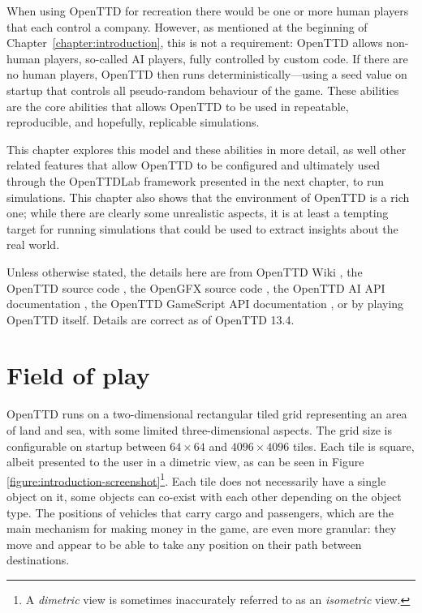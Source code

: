 \documentclass[logo,msc,dsti]{style/infthesis}    %
\begin{document}
{When using OpenTTD for recreation there would be one or more human players that each control a company. However, as mentioned at the beginning of Chapter~\ref{chapter:introduction}, this is not a requirement: OpenTTD allows non-human players, so-called AI players, fully controlled by custom code. If there are no human players, OpenTTD then runs deterministically---using a seed value on startup that controls all pseudo-random behaviour of the game. These abilities are the core abilities that allows OpenTTD to be used in repeatable, reproducible, and hopefully, replicable simulations.

This chapter explores this model and these abilities in more detail, as well other related features that allow OpenTTD to be configured and ultimately used through the OpenTTDLab framework presented in the next chapter, to run simulations. This chapter also shows that the environment of OpenTTD is a rich one; while there are clearly some unrealistic aspects, it is at least a tempting target for running simulations that could be used to extract  insights about the real world.

Unless otherwise stated, the details here are from OpenTTD Wiki \cite{OpenTTDWiki}, the OpenTTD source code \cite{OpenTTDSource}, the OpenGFX source code \cite{OpenGFXSource}, the OpenTTD AI API documentation \cite{OpenTTDAIAPIDocs}, the OpenTTD GameScript API documentation \cite{OpenTTDGSAPIDocs}, or by playing OpenTTD itself. Details are correct as of OpenTTD 13.4.

\section{Field of play}

OpenTTD runs on a two-dimensional rectangular tiled grid representing an area of land and sea, with some limited three-dimensional aspects. The grid size is configurable on startup between $64 \times 64$ and $4096 \times 4096$ tiles. Each tile is square, albeit presented to the user in a dimetric view, as can be seen in Figure \ref{figure:introduction-screenshot}\footnote{A \emph{dimetric} view is sometimes inaccurately referred to as an \emph{isometric} view.}. Each tile does not necessarily have a single object on it, some objects can co-exist with each other depending on the object type. The positions of vehicles that carry cargo and passengers, which are the main mechanism for making money in the game, are even more granular: they move and appear to be able to take any position on their path between destinations.

}
\end{document}
